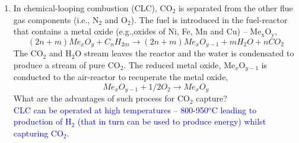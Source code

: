 \documentclass[14pt,twoside]{article}
\begin{document}
\begin{enumerate}
\begin{enumerate}
\item In chemical-looping combustion (CLC), CO$_{2}$ is separated from the other flue gas components (i.e., N$_{2}$ and O$_{2}$). The fuel is introduced in the fuel-reactor that contains a metal oxide (e.g.,oxides of Ni, Fe, Mn and Cu) -- Me$_{\text{x}}$O$_{\text{y}}$,
\begin{displaymath}
\left(2n + m\right)Me_{x}O_{y} + C_{n}H_{2m} \rightarrow \left(2n+m\right)Me_{x}O_{y-1} + mH_{2}O + nCO_{2}
\end{displaymath}
The CO$_{2}$ and H$_{2}$O stream leaves the reactor and the water is condensated to produce a stream of pure CO$_{2}$. The reduced metal oxide, Me$_{x}$O$_{y-1}$ is conducted to the air-reactor to recuperate the metal oxide,
\begin{displaymath}
Me_{x}O_{y-1}+ 1/2 O_{2} \rightarrow Me_{x}O_{y}
\end{displaymath}
What are the advantages of such process for CO$_{2}$ capture?  \\
  \textcolor{blue}{
CLC can be operated at high temperatures -- 800-950$^{\text{o}}$C leading to production of H$_{\text{2}}$ (that in turn can be used to produce energy) whilst capturing CO$_{\text{2}}$.} %
\end{enumerate}


\end{enumerate}
\end{document}
